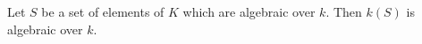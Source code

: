 Let $S$ be a set of elements of $K$ which are algebraic over $k$. Then $k(S)$ is algebraic over $k$.
